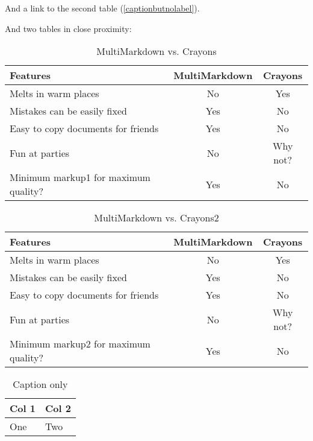 And a link to the second table (\autoref{captionbutnolabel}).

And two tables in close proximity:

\begin{table}[htbp]
\begin{minipage}{\linewidth}
\setlength{\tymax}{0.5\linewidth}
\centering
\small
\caption{MultiMarkdown vs. Crayons}
\label{multimarkdownvs.crayons}
\begin{tabulary}{\textwidth}{@{}LCC@{}} \toprule
Features&MultiMarkdown&Crayons\\
\midrule
Melts in warm places&No&Yes\\
Mistakes can be easily fixed&Yes&No\\
Easy to copy documents for friends&Yes&No\\
Fun at parties&No&Why not?\\

\midrule
Minimum markup1 for maximum quality?&Yes&No\\

\bottomrule

\end{tabulary}
\end{minipage}
\end{table}

\begin{table}[htbp]
\begin{minipage}{\linewidth}
\setlength{\tymax}{0.5\linewidth}
\centering
\small
\caption{MultiMarkdown vs. Crayons2}
\label{multimarkdownvs.crayons2}
\begin{tabulary}{\textwidth}{@{}LCC@{}} \toprule
Features&MultiMarkdown&Crayons\\
\midrule
Melts in warm places&No&Yes\\
Mistakes can be easily fixed&Yes&No\\
Easy to copy documents for friends&Yes&No\\
Fun at parties&No&Why not?\\

\midrule
Minimum markup2 for maximum quality?&Yes&No\\

\bottomrule

\end{tabulary}
\end{minipage}
\end{table}

\begin{table}[htbp]
\begin{minipage}{\linewidth}
\setlength{\tymax}{0.5\linewidth}
\centering
\small
\caption{Caption only}
\label{captiononly}
\begin{tabulary}{\textwidth}{@{}LL@{}} \toprule
Col 1&Col 2\\
\midrule
One&Two \\

\bottomrule

\end{tabulary}
\end{minipage}
\end{table}

